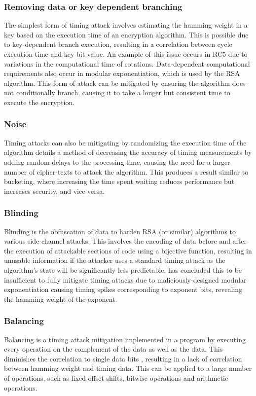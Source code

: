 \documentclass[british,11pt,a4paper]{article}
\begin{document}
\subsubsection{Removing data or key dependent branching}
The simplest form of timing attack involves estimating the hamming weight in a key
based on the execution time of an encryption algorithm. This is possible due to
key-dependent branch execution, resulting in a correlation between cycle execution time
and key bit value. An example of this issue occurs in RC5
\cite{Handschuh1999} due to variations in the computational time of rotations.
Data-dependent computational requirements also occur in modular exponentiation, which is used by the RSA algorithm.
This form of attack can be mitigated by ensuring the algorithm does not conditionally branch,
causing it to take a longer but consistent time to execute the encryption.

\subsubsection{Noise}
Timing attacks can also be mitigating by randomizing the execution time of the algorithm
\citet{kocher96timing} details a method of decreasing the accuracy of timing measurements
by adding random delays to the processing time, causing the need for a larger number of cipher-texts to attack
the algorithm. This produces a result similar to bucketing, where increasing the time spent waiting reduces performance but increases security, and vice-versa.

\subsubsection{Blinding}
Blinding is the obfuscation of data to harden RSA (or similar) algorithms to various side-channel attacks.
This involves the encoding of data before and after the execution of attackable sections of code using a bijective function,
resulting in unusable information if the attacker uses a standard timing attack as the algorithm's state will be significantly less predictable.
\citet{kocher96timing} has concluded this to be insufficient to fully mitigate timing attacks due to maliciously-designed modular exponentiation
causing timing spikes corresponding to exponent bits, revealing the hamming weight of the exponent.

\subsubsection{Balancing}
Balancing is a timing attack mitigation implemented in a program by executing every operation on the complement of the data as well as the data.
This diminishes the correlation to single data bits \cite{daemen-implementattacks}, resulting in a lack of correlation between hamming weight and timing data. This can be applied to a
large number of operations, such as fixed offset shifts, bitwise operations and arithmetic operations.
\end{document}
